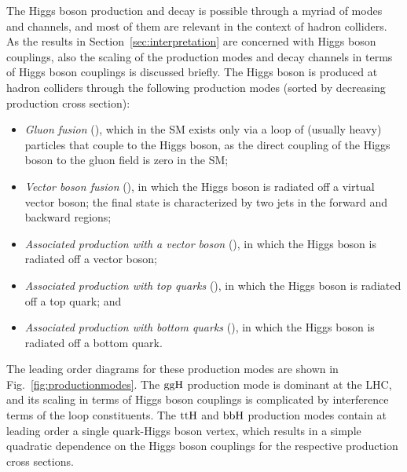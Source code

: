 The Higgs boson production and decay is possible through a myriad of modes and channels, and most of them are relevant in the context of hadron colliders.
% 
As the results in Section~\ref{sec:interpretation} are concerned with Higgs boson couplings, also the scaling of the production modes and decay channels in terms of Higgs boson couplings is discussed briefly.
% 
The Higgs boson is produced at hadron colliders through the following production modes (sorted by decreasing production cross section):
% 
\begin{itemize}
\item \textit{Gluon fusion} (\ggh), which in the SM exists only via a loop of (usually heavy) particles that couple to the Higgs boson, as the direct coupling of the Higgs boson to the gluon field is zero in the SM;
% 
\item \textit{Vector boson fusion} (\vbf), in which the Higgs boson is radiated off a virtual vector boson; the final state is characterized by two jets in the forward and backward regions;
% 
\item \textit{Associated production with a vector boson} (\vh), in which the Higgs boson is radiated off a vector boson;
% 
\item \textit{Associated production with top quarks} (\tth), in which the Higgs boson is radiated off a top quark; and
% 
\item \textit{Associated production with bottom quarks} (\bbh), in which the Higgs boson is radiated off a bottom quark.
\end{itemize}
% 
The leading order diagrams for these production modes are shown in Fig.~\ref{fig:productionmodes}.
% 
The $\mathrm{g}\mathrm{g}\mathrm{H}$ production mode is dominant at the LHC, and its scaling in terms of Higgs boson couplings is complicated by interference terms of the loop constituents.
% 
The $\mathrm{t}\mathrm{t}\mathrm{H}$ and $\mathrm{b}\mathrm{b}\mathrm{H}$ production modes contain at leading order a single quark-Higgs boson vertex, which results in a simple quadratic dependence on the Higgs boson couplings for the respective production cross sections.


